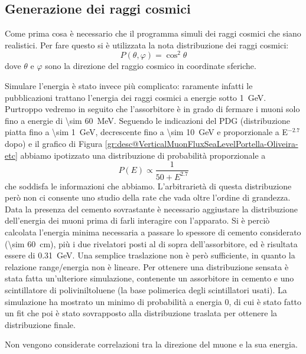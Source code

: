 \subsection{Generazione dei raggi cosmici}
Come prima cosa è necessario che il programma simuli dei raggi cosmici che siano realistici. Per fare questo si è utilizzata la nota distribuzione dei raggi cosmici:
\begin{equation}
	P\left(\theta, \varphi\right) = \cos^2{\theta}
	\label{eq:distr_cosmici}
\end{equation}
dove $\theta$ e $\varphi$ sono la direzione del raggio cosmico in coordinate sferiche.

Simulare l'energia \`e stato invece pi\`u complicato: raramente infatti le pubblicazioni trattano l'energia dei raggi cosmici a energie sotto \SI{1}{\GeV}. 
Purtroppo vedremo in seguito che l'assorbitore \`e in grado di fermare i muoni solo fino a energie di \SI{\sim 60}{\MeV}. 
Seguendo le indicazioni del PDG \cite{bib:Patrignani:2016xqp} (distribuzione piatta fino a \SI{\sim 1}{\GeV}, decrescente fino a \SI{\sim 10}{\GeV} e proporzionale a E$^{-2.7}$ dopo) e il grafico di Figura \ref{gr:desc@VerticalMuonFluxSeaLevelPortella-Oliveira-etc} abbiamo ipotizzato una distribuzione di probabilit\`a proporzionale a 
\begin{equation}
	P\left(E\right) \propto \frac{1}{50+E^{2.7}}
	\label{eq:distr_cosmici_en}
\end{equation}
che soddisfa le informazioni che abbiamo. L'arbitrariet\`a di questa distribuzione per\`o non ci consente uno studio della rate che vada oltre l'ordine di grandezza.
Data la presenza del cemento sovrastante \`e necessario aggiustare la distribuzione dell'energia dei muoni prima di farli interagire con l'apparato. 
Si \`e perci\`o calcolata l'energia minima necessaria a passare lo spessore di cemento considerato (\SI{\sim 60}{\cm}), pi\`u i due rivelatori posti al di sopra dell'assorbitore, ed \`e risultata essere di \SI{0.31}{\GeV}. 
Una semplice traslazione non \`e per\`o sufficiente, in quanto la relazione range/energia non \`e lineare. 
Per ottenere una distribuzione sensata \`e stata fatta un'ulteriore simulazione, contenente un assorbitore in cemento e uno scintillatore di poliviniltoluene (la base polimerica degli scintillatori usati). 
La simulazione ha mostrato un minimo di probabilit\`a a energia 0, di cui \`e stato fatto un fit che poi \`e stato sovrapposto alla distribuzione traslata per ottenere la distribuzione finale.

Non vengono considerate correlazioni tra la direzione del muone e la sua energia.

